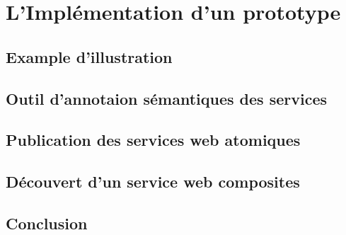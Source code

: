 \chapter{L'Implémentation d'un prototype}

\section{Example d'illustration}
\label{sec:example-dill-5}
\section{Outil d'annotaion sémantiques des services}
\label{sec:outil-dann-semant}
\section{Publication des services web atomiques}
\label{sec:atomic-publication}
\section{Découvert d'un service web composites}
\label{sec:composite-discovery}
\section{Conclusion}
\label{sec:Conclusion}

